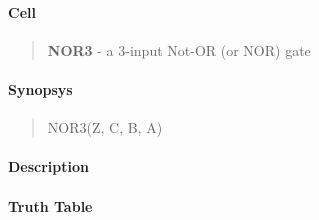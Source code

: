 \label{NOR3}
\paragraph{Cell}
\begin{quote}
    \textbf{NOR3} - a 3-input Not-OR (or NOR) gate
\end{quote}

\paragraph{Synopsys}
\begin{quote}
    NOR3(Z, C, B, A)
\end{quote}

\paragraph{Description}



\paragraph{Truth Table}


